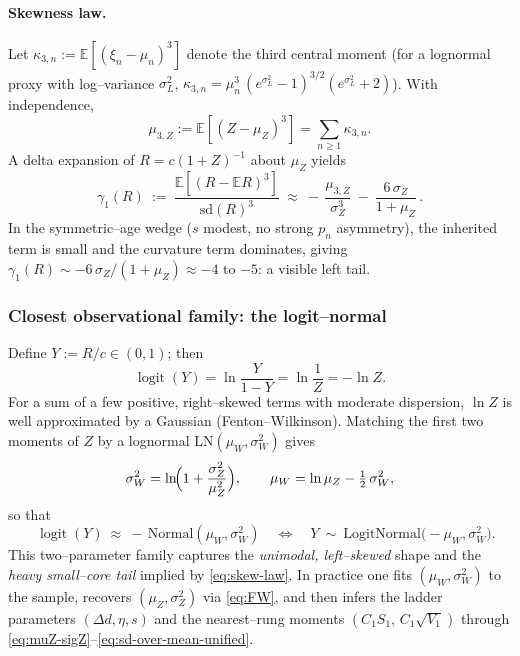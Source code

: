 \documentclass[10pt]{article}
\theoremstyle{definition}
\theoremstyle{plain}
\begin{document}
\paragraph{Skewness law.}\label{par:uom-main-192}
Let $\kappa_{3,n}:=\mathbb E[(\xi_n-\mu_n)^3]$ denote the third central moment (for a lognormal proxy with log–variance $\sigma_L^2$, $\kappa_{3,n}=\mu_n^3\,(e^{\sigma_L^2}-1)^{3/2}(e^{\sigma_L^2}+2)$). With independence,
\[
\mu_{3,Z}:=\mathbb E[(Z-\mu_Z)^3]=\sum_{n\ge 1}\kappa_{3,n}.
\]
A delta expansion of $R=c(1+Z)^{-1}$ about $\mu_Z$ yields
\begin{equation}
\boxed{\qquad
\gamma_1(R)\ :=\ \frac{\mathbb E[(R-\mathbb E R)^3]}{\mathrm{sd}(R)^3}
\ \approx\ -\,\frac{\mu_{3,Z}}{\sigma_Z^3}\ -\ \frac{6\,\sigma_Z}{1+\mu_Z}\,.
\qquad}
\label{eq:skew-law}
\end{equation}
In the symmetric–age wedge ($s$ modest, no strong $p_n$ asymmetry), the inherited term is small and the curvature term dominates, giving $\gamma_1(R)\sim -6\,\sigma_Z/(1+\mu_Z)\approx -4$ to $-5$: a visible left tail.

\subsubsection*{Closest observational family: the logit–normal}
\label{subsubsec:logitnormal}

Define $Y:=R/c\in(0,1)$; then
\[
\operatorname{logit}(Y)=\ln\frac{Y}{1-Y}=\ln\frac{1}{Z}=-\ln Z.
\]
For a sum of a few positive, right–skewed terms with moderate dispersion, $\ln Z$ is well approximated by a Gaussian (Fenton–Wilkinson). Matching the first two moments of $Z$ by a lognormal $\mathrm{LN}(\mu_W,\sigma_W^2)$ gives
\begin{equation}
\sigma_W^2=\ln\!\Bigl(1+\frac{\sigma_Z^2}{\mu_Z^2}\Bigr),\qquad 
\mu_W=\ln\mu_Z-\tfrac12\,\sigma_W^2,
\label{eq:FW}
\end{equation}
so that
\begin{equation}
\boxed{\qquad
\operatorname{logit}(Y)\ \approx\ -\,\mathrm{Normal}(\mu_W,\sigma_W^2)
\quad\Longleftrightarrow\quad
Y\ \sim\ \mathrm{LogitNormal}\bigl(-\mu_W,\sigma_W^2\bigr).
\qquad}
\label{eq:logitnormal}
\end{equation}
This two–parameter family captures the \emph{unimodal, left–skewed} shape and the \emph{heavy small–core tail} implied by \eqref{eq:skew-law}. In practice one fits $(\mu_W,\sigma_W^2)$ to the sample, recovers $(\mu_Z,\sigma_Z^2)$ via \eqref{eq:FW}, and then infers the ladder parameters $(\Delta d,\eta,s)$ and the nearest–rung moments $(C_1S_1,\,C_1\sqrt{V_1})$ through \eqref{eq:muZ-sigZ}–\eqref{eq:sd-over-mean-unified}.
\end{document}
